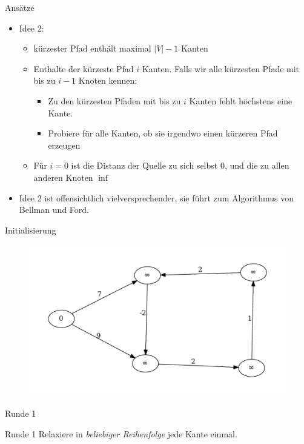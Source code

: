 \begin{frame}{Ansätze}
\begin{itemize}
\item
  Idee 2:
  \begin{itemize}
  \item
    kürzester Pfad enthält maximal $|V| - 1$ Kanten
  \item
    Enthalte der kürzeste Pfad $i$ Kanten. Falls wir alle kürzesten
    Pfade mit bis zu $i - 1$ Knoten kennen:

    \begin{itemize}
    \item
      Zu den kürzesten Pfaden mit bis zu $i$ Kanten fehlt höchstens eine
      Kante.
    \item
      Probiere für alle Kanten, ob sie irgendwo einen kürzeren Pfad
      erzeugen
    \end{itemize}
  \item
    Für $i = 0$ ist die Distanz der Quelle zu sich selbst 0, und die zu
    allen anderen Knoten $\inf$
  \end{itemize}
\item
  Idee 2 ist offensichtlich vielversprechender, sie führt zum
  Algorithmus von Bellman und Ford.
\end{itemize}
\end{frame}

\begin{frame}{Initialisierung}
\begin{figure}[htbp]
\centering
\includegraphics[width=\linewidth]{bellman_ford_graphs/graph_00.pdf}
\end{figure}
\end{frame}

\begin{frame}{Runde 1}
	\begin{block}{Runde 1}
	Relaxiere in \textit{beliebiger Reihenfolge} jede Kante einmal.
	\end{block}
\end{frame}

